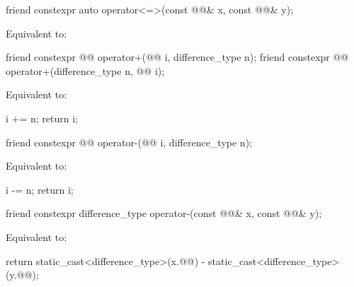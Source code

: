 %
\begin{itemdecl}
friend constexpr auto operator<=>(const @@& x, const @@& y);
\end{itemdecl}

\begin{itemdescr}
\pnum
\effects
Equivalent to: 
\end{itemdescr}

%
\begin{itemdecl}
friend constexpr @@ operator+(@@ i, difference_type n);
friend constexpr @@ operator+(difference_type n, @@ i);
\end{itemdecl}

\begin{itemdescr}
\pnum
\effects
Equivalent to:
\begin{codeblock}
i += n;
return i;
\end{codeblock}
\end{itemdescr}

%
\begin{itemdecl}
friend constexpr @@ operator-(@@ i, difference_type n);
\end{itemdecl}

\begin{itemdescr}
\pnum
\effects
Equivalent to:
\begin{codeblock}
i -= n;
return i;
\end{codeblock}
\end{itemdescr}

%
\begin{itemdecl}
friend constexpr difference_type operator-(const @@& x, const @@& y);
\end{itemdecl}

\begin{itemdescr}
\pnum
\effects
Equivalent to:
\begin{codeblock}
return static_cast<difference_type>(x.@@) - static_cast<difference_type>(y.@@);
\end{codeblock}
\end{itemdescr}

